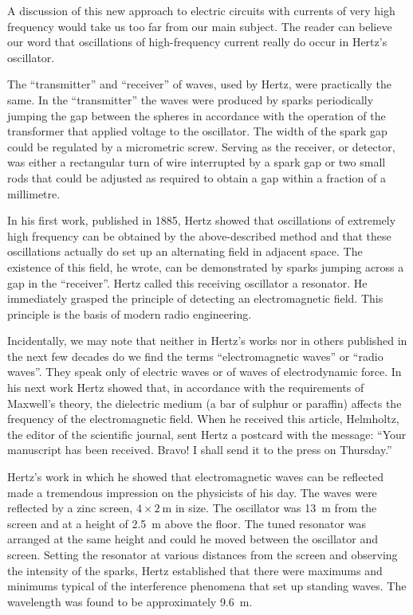 A discussion of this new approach to electric circuits with currents of very high frequency would take us too far from our main subject. The reader can believe our word that oscillations of high-frequency current really do occur in Hertz's oscillator.

The ``transmitter'' and ``receiver'' of waves, used by Hertz, were practically the same. In the ``transmitter'' the waves were produced by sparks periodically jumping the gap between the spheres in accordance with the operation of the transformer that applied voltage to the oscillator. The width of the spark gap could be regulated by a micrometric screw. Serving as the receiver, or detector, was either a rectangular turn of wire interrupted by a spark gap or two small rods that could be adjusted as required to obtain a gap within a fraction of a millimetre.

In his first work, published in 1885, Hertz showed that oscillations of extremely high frequency can be obtained by the above-described method and that these oscillations actually do set up an alternating field in adjacent space. The existence of this field, he wrote, can be demonstrated by sparks jumping across a gap in the ``receiver''. Hertz called this receiving oscillator a resonator. He immediately grasped the principle of detecting an electromagnetic field. This principle is the basis of modern radio engineering.

Incidentally, we may note that neither in Hertz's works nor in others published in the next few decades do we find the terms ``electromagnetic waves'' or ``radio waves''. They speak only of electric waves or of waves of electrodynamic force.
In his next work Hertz showed that, in accordance with the requirements of Maxwell's theory, the dielectric medium (a bar of sulphur or paraffin) affects the frequency of the electromagnetic field. When he received this article, Helmholtz, the editor of the scientific journal, sent Hertz a postcard with the message: ``Your manuscript has been received. Bravo! I shall send it to the press on Thursday.''

Hertz's work in which he showed that electromagnetic waves can be reflected made a tremendous impression on the physicists of his day. The waves were reflected by a zinc screen, $4 \times \SI{2}{\meter}$ in size. The oscillator was \SI{13}{\meter} from the screen and at a height of \SI{2.5}{\meter} above the floor. The tuned resonator was arranged at the same height and could he moved between the oscillator and screen. Setting the resonator at various distances from the screen and observing the intensity of the sparks, Hertz established that there were maximums and minimums typical of the interference phenomena that set up standing waves. The wavelength was found to be approximately \SI{9.6}{\meter}.


